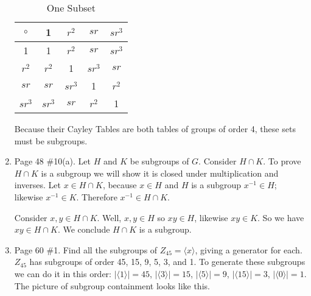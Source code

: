 \documentclass[12pt]{report}
\begin{document}
\begin{enumerate}
      \begin{table}[h]
      \centering
      \caption{One Subset}
      \begin{tabular}{c|cccc}
        $\circ$ &1      &$r^2$  &$sr$   &$sr^3$  \\
        \hline
        1       &1      &$r^2$  &$sr$   &$sr^3$  \\
        $r^2$   &$r^2$  &1      &$sr^3$ &$sr$    \\
        $sr$    &$sr$   &$sr^3$ &1      &$r^2$   \\
        $sr^3$  &$sr^3$ &$sr$   &$r^2$  &1
      \end{tabular}
      \end{table}
      Because their Cayley Tables are both tables of groups of order 4, these
      sets must be subgroups.

\item Page 48 \#10(a). Let $H$ and $K$ be subgroups of $G$. Consider
      $H \cap K$. To prove $H \cap K$ is a subgroup we will show it is closed
      under multiplication and inverses. Let $x \in H \cap K$, because $x \in H$
      and $H$ is a subgroup $x^{-1} \in H$; likewise $x^{-1} \in K$.
      Therefore $x^{-1} \in H \cap K$.

      Consider $x,y \in H \cap K$. Well, $x,y \in H$ so $xy \in H$, likewise
      $xy \in K$. So we have $xy \in H \cap K$. We conclude $H \cap K$ is a
      subgroup.

\item Page 60 \#1.
      Find all the subgroups of $Z_45 = \langle x \rangle$, giving a generator
      for each. $Z_45$ has subgroups of order 45, 15, 9, 5, 3, and 1. To
      generate these subgroups we can do it in this order: $|\langle 1 \rangle|
      = 45$, $|\langle 3 \rangle| = 15$, $|\langle 5 \rangle| = 9$, $|\langle 15
      \rangle| = 3$, $|\langle 0 \rangle| = 1$. The picture of subgroup
      containment looks like this.

\begin{figure}[h]
  \centering
{}
\end{figure}
\end{enumerate}
\end{document}
